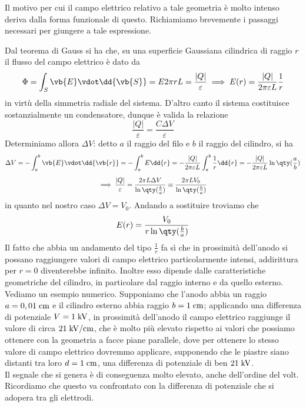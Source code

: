 \begin{esempio}
   Il motivo per cui il campo elettrico relativo a tale geometria è molto intenso deriva dalla forma funzionale di questo. Richiamiamo brevemente i passaggi necessari per giungere a tale espressione.

   Dal teorema di Gauss si ha che, su una superficie Gaussiana cilindrica di raggio $r$ il flusso del campo elettrico è dato da
   \begin{equation*}
      \Phi
      =\int_{S} \vb{E} \vdot \dd{\vb{S}}
      =E2\pi r L
      =\frac{|Q|}{\varepsilon}
      \implies
      E(r)=\frac{|Q|}{2\pi\varepsilon L} \frac{1}{r}
   \end{equation*}
   in virtù della simmetria radiale del sistema. D'altro canto il sistema costituisce sostanzialmente un condensatore, dunque è valida la relazione
   \begin{equation*}
      \frac{|Q|}{\varepsilon}
      =\frac{C \Delta V}{\varepsilon}
   \end{equation*}
   Determiniamo allora $\Delta V$: detto $a$ il raggio del filo e $b$ il raggio del cilindro, si ha
   \begin{gather*}
      \Delta V
      =-\int_{a}^{b} \vb{E} \vdot \dd{\vb{r}}
      =-\int_{a}^{b} E \dd{r}
      =-\frac{|Q|}{2\pi\varepsilon L} \int_{a}^{b} \frac{1}{r} \dd{r}
      =-\frac{|Q|}{2\pi\varepsilon L} \ln\qty(\frac{a}{b})
      \\[0.2cm]
      \implies
      \frac{|Q|}{\varepsilon}
      =\frac{2\pi L \Delta V}{\ln\qty(\frac{b}{a})}
      \equiv \frac{2\pi L V_0}{\ln\qty(\frac{b}{a})}
   \end{gather*}
   in quanto nel nostro caso $\Delta V=V_0$. Andando a sostituire troviamo che
   \begin{equation*}
      E(r)=\frac{V_0}{r \ln\qty(\frac{b}{a})}
   \end{equation*}
   Il fatto che abbia un andamento del tipo $\frac{1}{r}$ fa sì che in prossimità dell'anodo si possano raggiungere valori di campo elettrico particolarmente intensi, addirittura per $r=0$ diventerebbe infinito. Inoltre esso dipende dalle caratteristiche geometriche del cilindro, in particolare dal raggio interno e da quello esterno.\\
   Vediamo un esempio numerico. Supponiamo che l'anodo abbia un raggio $a=0,01 \; \rm cm$ e il cilindro esterno abbia raggio $b=1 \; \rm cm$; applicando una differenza di potenziale $V=1 \; \rm kV$, in prossimità dell'anodo il campo elettrico raggiunge il valore di circa $21 \; \rm kV/cm$, che è molto più elevato rispetto ai valori che possiamo ottenere con la geometria a facce piane parallele, dove per ottenere lo stesso valore di campo elettrico dovremmo applicare, supponendo che le piastre siano distanti tra loro $d=1 \; \rm cm$, una differenza di potenziale di ben $21 \; \rm kV$.\\
   Il segnale che si genera è di conseguenza molto elevato, anche dell'ordine del volt. Ricordiamo che questo va confrontato con la differenza di potenziale che si adopera tra gli elettrodi.
\end{esempio}

